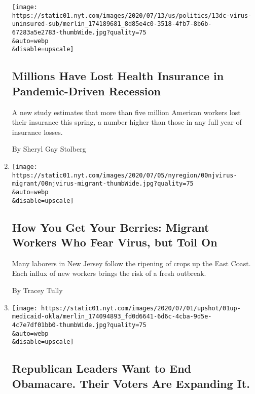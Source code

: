 \begin{enumerate}
  \texttt{[image: https://static01.nyt.com/images/2020/07/13/us/politics/13dc-virus-uninsured-sub/merlin\_174189681\_8d85e4c0-3518-4fb7-8b6b-67283a5e2783-thumbWide.jpg?quality=75\\\&auto=webp\\\&disable=upscale]}

  \hypertarget{millions-have-lost-health-insurance-in-pandemic-driven-recession}{%
  \subsection{Millions Have Lost Health Insurance in Pandemic-Driven
  Recession}\label{millions-have-lost-health-insurance-in-pandemic-driven-recession}}

  A new study estimates that more than five million American workers
  lost their insurance this spring, a number higher than those in any
  full year of insurance losses.

  By Sheryl Gay Stolberg
\item
  \href{/2020/07/05/nyregion/nj-migrant-workers-covid-19.html}{}

  \texttt{[image: https://static01.nyt.com/images/2020/07/05/nyregion/00njvirus-migrant/00njvirus-migrant-thumbWide.jpg?quality=75\\\&auto=webp\\\&disable=upscale]}

  \hypertarget{how-you-get-your-berries-migrant-workers-who-fear-virus-but-toil-on}{%
  \subsection{How You Get Your Berries: Migrant Workers Who Fear Virus,
  but Toil
  On}\label{how-you-get-your-berries-migrant-workers-who-fear-virus-but-toil-on}}

  Many laborers in New Jersey follow the ripening of crops up the East
  Coast. Each influx of new workers brings the risk of a fresh outbreak.

  By Tracey Tully
\item
  \href{/2020/07/01/upshot/oklahoma-obamacare-Republican-voters-expand.html}{}

  \texttt{[image: https://static01.nyt.com/images/2020/07/01/upshot/01up-medicaid-okla/merlin\_174094893\_fd0d6641-6d6c-4cba-9d5e-4c7e7df01bb0-thumbWide.jpg?quality=75\\\&auto=webp\\\&disable=upscale]}

  \hypertarget{republican-leaders-want-to-end-obamacare-their-voters-are-expanding-it}{%
  \subsection{Republican Leaders Want to End Obamacare. Their Voters Are
  Expanding
  It.}\label{republican-leaders-want-to-end-obamacare-their-voters-are-expanding-it}}


\end{enumerate}
